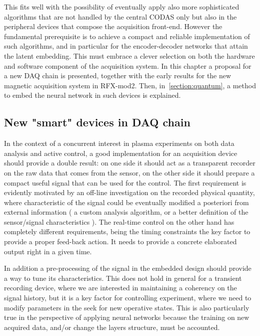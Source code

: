 This fits well with the possibility of eventually apply also more sophisticated algorithms that are not handled by the central CODAS only but also in the peripheral devices that compose the acquisition front-end. 
However the fundamental prerequisite is to achieve a compact and reliable implementation of such algorithms, and in particular for the encoder-decoder networks that attain the latent embedding. This must embrace a clever selection on both the hardware and software component of the acquisition system. In this chapter a proposal for a new DAQ chain is presented, together with the early results for the new magnetic acquisition system in RFX-mod2. Then, in~\cref{section:quantum}, a method to embed the neural network in such devices is explained.


\subsection{New "smart" devices in DAQ chain}
\label{section:daq-chain}

In the context of a concurrent interest in plasma experiments on both data analysis and active control, a good implementation for an acquisition device should provide a double result: on one side it should act as a transparent recorder on the raw data that comes from the sensor, on the other side it should prepare a compact useful signal that can be used for the control.
The first requirement is evidently motivated by an off-line investigation on the recorded physical quantity, where characteristic of the signal could be eventually modified a posteriori from external information ( a custom analysis algorithm, or a better definition of the sensor/signal characteristics ). 
The real-time control on the other hand has completely different requirements, being the timing constraints the key factor to provide a proper feed-back action. It needs to provide a concrete elaborated output right in a given time.

In addition a pre-processing of the signal in the embedded design should provide a way to tune its characteristics. This does not hold in general for a transient recording device, where we are interested in maintaining a coherency on the signal history, but it is a key factor for controlling experiment, where we need to modify parameters in the seek for new operative states. This is also particularly true in the perspective of applying neural networks because the training on new acquired data, and/or change the layers structure, must be accounted.

